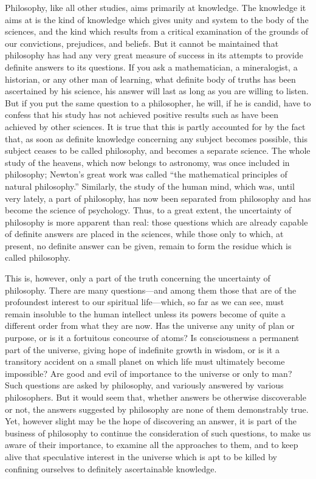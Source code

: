 
Philosophy, like all other studies, aims primarily at knowledge. The
\linebreak[4] knowledge it aims at is the kind of knowledge which
gives unity and system to the body of the sciences, and the kind which
results from a critical examination of the grounds of our convictions,
prejudices, and beliefs. But it cannot be maintained that philosophy
has had any very great measure of success in its attempts to provide
definite answers to its questions. If you ask a mathematician, a
mineralogist, a historian, or any other man of learning, what definite
body of truths has been ascertained by his science, his answer will
last as long as you are willing to listen. But if you put the same
question to a philosopher, he will, if he is  candid, have
to confess that his study has not achieved positive results such as
have been achieved by other sciences. It is true that this is partly
accounted for by the fact that, as soon as definite knowledge
concerning any subject becomes possible, this subject ceases to be
called philosophy, and becomes a separate science. The whole study of
the heavens, which now belongs to astronomy, was once included in
philosophy; Newton's great work was called ``the mathematical
principles of natural philosophy.'' Similarly, the study of the human
mind, which was, until very lately, a part of philosophy, has now been
separated from philosophy and has become the science of psychology.
Thus, to a great extent, the uncertainty of philosophy is more
apparent than real: those questions which are already capable of
definite answers are placed in the sciences, while those only to
which, at present, no definite answer can be given, remain to form the
residue which is called philosophy.

This is, however, only a part of the truth concerning the uncertainty
of philosophy. There are many ques\-tions---and among them 
those that are of the profoundest interest to our spiritual
life---which, so far as we can see, must remain insoluble to the human
intellect unless its powers become of quite a different order from
what they are now. Has the universe any unity of plan or purpose, or
is it a fortuitous concourse of atoms? Is consciousness a permanent
part of the universe, giving hope of indefinite growth in wisdom, or
is it a transitory accident on a small planet on which life must
ultimately become impossible? Are good and evil of importance to the
universe or only to man? Such questions are asked by philosophy, and
variously answered by various philosophers. But it would seem that,
whether answers be otherwise discoverable or not, the answers
suggested by philosophy are none of them demonstrably true. Yet,
however slight may be the hope of discovering an answer, it is part of
the business of philosophy to continue the consideration of such
questions, to make us aware of their importance, to examine all the
approaches to them, and to keep alive that speculative interest in the
universe which is  apt to be killed by confining ourselves
to definitely ascertainable knowledge.

